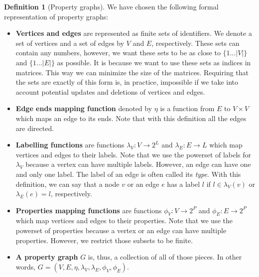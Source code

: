 \documentclass[14pt]{constructor-thesis}
\theoremstyle{definition}
\newtheorem{definition}{Definition}
\begin{document}
\begin{definition}[Property graphs]
  \label{def:property-graph}
  We have chosen the following formal representation of property graphs:
  \begin{itemize}
    \item \textbf{Vertices and edges} are represented as finite sets of identifiers. We denote a set of vertices and a set of edges by $V$ and $E$, respectively. These sets can contain any numbers, however, we want these sets to be as close to $\{1 \dots |V|\}$ and $\{1 \dots |E|\}$ as possible. It is because we want to use these sets as indices in matrices. This way we can minimize the size of the matrices. Requiring that the sets are exactly of this form is, in practice, impossible if we take into account potential updates and deletions of vertices and edges.
    \item \textbf{Edge ends mapping function} denoted by $\eta$ is a function from $E$ to $V \times V$ which maps an edge to its ends. Note that with this definition all the edges are directed.
    \item \textbf{Labelling functions} are functions $\lambda_V : V \to 2^L$ and $\lambda_E : E \to L$ which map vertices and edges to their labels. Note that we use the powerset of labels for $\lambda_V$ because a vertex can have multiple labels. However, an edge can have one and only one label. The label of an edge is often called its \textit{type}. With this definition, we can say that a node $v$ or an edge $e$ has a label $l$ if $l \in \lambda_V(v)$ or $\lambda_E(e) = l$, respectively.
    \item \textbf{Properties mapping functions} are functions $\phi_V : V \to 2^P$ and $\phi_E : E \to 2^P$ which map vertices and edges to their properties. Note that we use the powerset of properties because a vertex or an edge can have multiple properties. However, we restrict those subsets to be finite.
    \item \textbf{A property graph} $G$ is, thus, a collection of all of those pieces. In other words, $G = (V, E, \eta, \lambda_V, \lambda_E, \phi_V, \phi_E)$.
  \end{itemize}
\end{definition}
\end{document}
